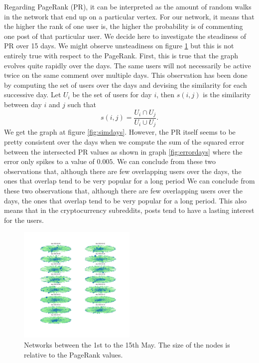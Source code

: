 Regarding PageRank (PR), it can be interpreted as the amount of random walks in the network that end up on a particular vertex. For our network, it means that the higher the rank of one user is, the higher the probability is of commenting one post of that particular user. We decide here to investigate the steadiness of PR over 15 days. We might observe unsteadiness on figure \ref{fig:rankdays} but this is not entirely true with respect to the PageRank. First, this is true that the graph evolves quite rapidly over the days. The same users will not necessarily be active twice on the same comment over multiple days. This observation has been done by computing the set of users over the days and devising the similarity for each successive day. Let $U_i$ be the set of users for day $i$, then $s\left(i,j\right)$ is the similarity between day $i$ and $j$ such that $$s\left(i,j\right)=\frac{U_i\cap U_{j}}{U_i\cup U_{j}}.$$ We get the graph at figure \ref{fig:simdays}. However, the PR itself seems to be pretty consistent over the days when we compute the sum of the squared error between the intersected PR values as shown in graph \ref{fig:errordays} where the error only spikes to a value of $0.005$. We can conclude from these two observations that, although there are few overlapping users over the days, the ones that overlap tend to be very popular for a long period We can conclude from these two observations that, although there are few overlapping users over the days, the ones that overlap tend to be very popular for a long period. This also means that in the cryptocurrency subreddits, posts tend to have a lasting interest for the users.
\begin{figure}[hb!]
    \centering
    \includegraphics[width=0.5\textwidth]{figures/rank_days.pdf}
    \caption{Networks between the 1st to the 15th May. The size of the nodes is relative to the PageRank values.}
    \label{fig:rankdays}
\end{figure}
